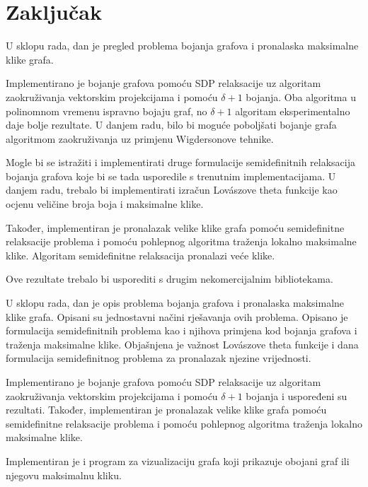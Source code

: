 \documentclass[diplomskirad]{fer}
\begin{document}
\chapter{Zaključak}
\label{pog:zakljucak}
U sklopu rada, dan je pregled problema bojanja grafova i pronalaska maksimalne klike grafa.

Implementirano je bojanje grafova pomoću SDP relaksacije uz algoritam zaokruživanja vektorskim projekcijama i pomoću $\delta + 1$ bojanja. 
Oba algoritma u polinomnom vremenu ispravno bojaju graf, no $\delta +1$ algoritam eksperimentalno daje bolje rezultate.
U danjem radu, bilo bi moguće poboljšati bojanje grafa algoritmom zaokruživanja uz primjenu Wigdersonove tehnike. %

Mogle bi se istražiti i implementirati druge formulacije semidefinitnih relaksacija bojanja grafova koje bi se tada usporedile s trenutnim
implementacijama. U danjem radu, trebalo bi implementirati izračun Lovászove theta funkcije kao ocjenu veličine broja boja i maksimalne klike.

Također, implementiran je pronalazak velike klike grafa pomoću semidefinitne relaksacije problema i pomoću
pohlepnog algoritma traženja lokalno maksimalne klike. Algoritam semidefinitne relaksacija pronalazi veće klike.

Ove rezultate trebalo bi usporediti s drugim nekomercijalnim bibliotekama.








\begin{sazetak}
U sklopu rada, dan je opis problema bojanja grafova i pronalaska maksimalne klike grafa. Opisani su jednostavni načini rješavanja
ovih problema. Opisano je formulacija semidefinitnih problema kao i njihova primjena kod bojanja grafova i traženja maksimalne klike.
Objašnjena je važnost Lovászove theta funkcije i dana formulacija semidefinitnog problema za pronalazak njezine vrijednosti.

Implementirano je bojanje grafova pomoću SDP relaksacije uz algoritam zaokruživanja vektorskim projekcijama i pomoću $\delta + 1$ bojanja
i uspoređeni su rezultati. Također, implementiran je pronalazak velike klike grafa pomoću semidefinitne relaksacije problema i pomoću
pohlepnog algoritma traženja lokalno maksimalne klike.

Implementiran je i program za vizualizaciju grafa koji prikazuje obojani graf ili njegovu maksimalnu kliku.

\end{sazetak}
\end{document}
